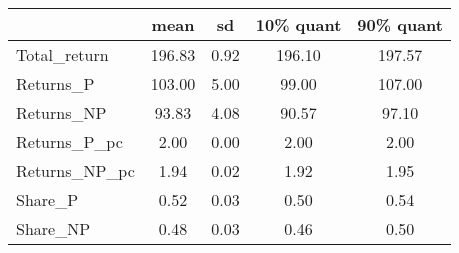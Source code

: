 \begin{tabular}{lcccc}
\toprule
{} &    mean &    sd &  10\% quant &  90\% quant \\
\midrule
Total\_return  &  196.83 &  0.92 &     196.10 &     197.57 \\
Returns\_P     &  103.00 &  5.00 &      99.00 &     107.00 \\
Returns\_NP    &   93.83 &  4.08 &      90.57 &      97.10 \\
Returns\_P\_pc  &    2.00 &  0.00 &       2.00 &       2.00 \\
Returns\_NP\_pc &    1.94 &  0.02 &       1.92 &       1.95 \\
Share\_P       &    0.52 &  0.03 &       0.50 &       0.54 \\
Share\_NP      &    0.48 &  0.03 &       0.46 &       0.50 \\
\bottomrule
\end{tabular}
